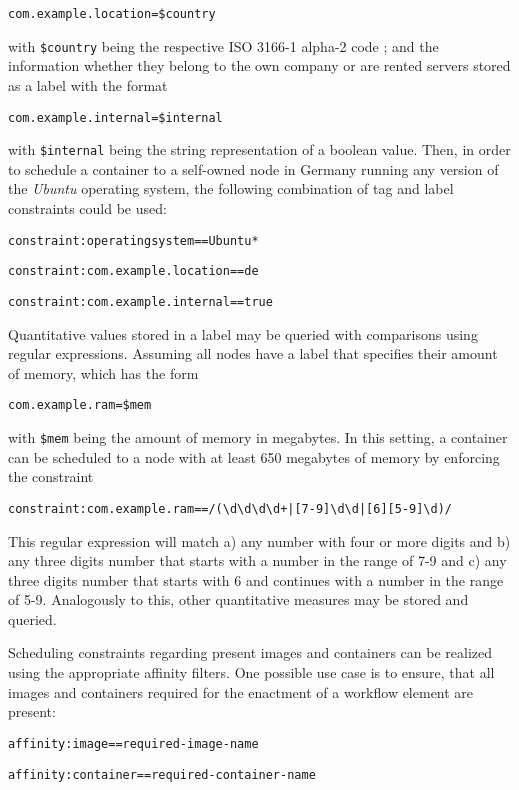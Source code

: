     \centerline{\texttt{com.example.location=\$country}}

    with \texttt{\$country} being the respective ISO 3166-1 alpha-2 code \cite{Standardization2013De}; and the information whether they belong to the own company or are rented servers stored as a label with the format

    \centerline{\texttt{com.example.internal=\$internal}}

    with \texttt{\$internal} being the string representation of a boolean value. Then, in order to schedule a container to a self-owned node in Germany running any version of the \emph{Ubuntu} operating system, the following combination of tag and label constraints could be used:

    \centerline{\texttt{constraint:operatingsystem==Ubuntu*}}
    \centerline{\texttt{constraint:com.example.location==de}}
    \centerline{\texttt{constraint:com.example.internal==true}}

    Quantitative values stored in a label may be queried with comparisons using regular expressions. Assuming all nodes have a label that specifies their amount of memory, which has the form

    \centerline{\texttt{com.example.ram=\$mem}}

    with \texttt{\$mem} being the amount of memory in megabytes. In this setting, a container can be scheduled to a node with at least 650 megabytes of memory by enforcing the constraint

    \centerline{\texttt{constraint:com.example.ram==/({\textbackslash}d{\textbackslash}d{\textbackslash}d{\textbackslash}d+|[7-9]{\textbackslash}d{\textbackslash}d|[6][5-9]{\textbackslash}d)/}}

    This regular expression will match a) any number with four or more digits and b) any three digits number that starts with a number in the range of 7-9 and c) any three digits number that starts with 6 and continues with a number in the range of 5-9. Analogously to this, other quantitative measures may be stored and queried.

    Scheduling constraints regarding present images and containers can be realized using the appropriate affinity filters. One possible use case is to ensure, that all images and containers required for the enactment of a workflow element are present:

    \centerline{\texttt{affinity:image==required-image-name}}
    \centerline{\texttt{affinity:container==required-container-name}}

